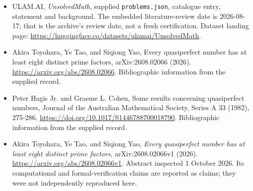 \documentclass[11pt,a4paper]{article}
\begin{document}
{\small

\begin{itemize}

\item[\hypertarget{source:statement:1}{S1}] ULAM.AI, \emph{UnsolvedMath}, supplied \texttt{problems.json}, catalogue entry, statement and background. The embedded literature-review date is 2026-08-17; that is the archive’s review date, not a fresh certification. Dataset landing page: \url{https://huggingface.co/datasets/ulamai/UnsolvedMath}.

\item[\hypertarget{source:statement:2}{S2}] Akira Toyohara, Ye Tao, and Siqiong Yao, Every quasiperfect number has at least eight distinct prime factors, arXiv:2608.02066 (2026). \url{https://arxiv.org/abs/2608.02066}. Bibliographic information from the supplied record.

\item[\hypertarget{source:statement:3}{S3}] Peter Hagis Jr. and Graeme L. Cohen, Some results concerning quasiperfect numbers, Journal of the Australian Mathematical Society, Series A 33 (1982), 275-286. \url{https://doi.org/10.1017/S1446788700018790}. Bibliographic information from the supplied record.


\item[E1] Akira Toyohara, Ye Tao, and Siqiong Yao,
\emph{Every quasiperfect number has at least eight distinct prime
factors}, arXiv:2608.02066v1 (2026).
\url{https://arxiv.org/abs/2608.02066v1}. Abstract inspected
1 October 2026. Its computational and formal-verification claims are
reported as claims; they were not independently reproduced here.

\end{itemize}

}

\label{end:statement}
\end{document}
